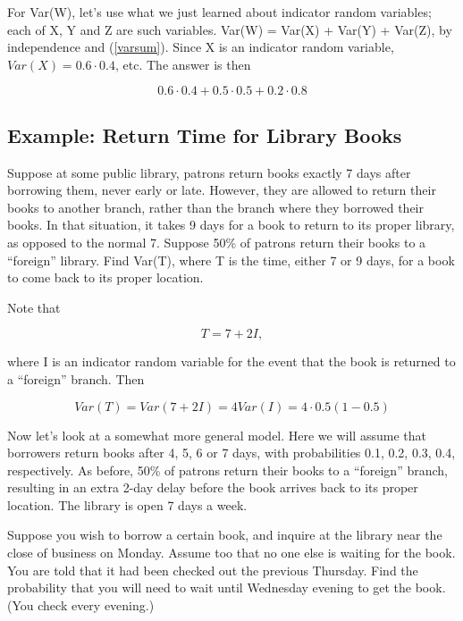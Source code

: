 For Var(W), let's use what we just learned about indicator random
variables; each of X, Y and Z are such variables.  Var(W) = Var(X) +
Var(Y) + Var(Z), by independence and (\ref{varsum}).  Since X is an
indicator random variable, $Var(X) = 0.6 \cdot 0.4$, etc.  The answer is
then

\begin{equation}
0.6 \cdot 0.4 +
0.5 \cdot 0.5 +
0.2 \cdot 0.8
\end{equation}

\subsection{Example:  Return Time for Library Books}

Suppose at some public library, patrons return books
exactly 7 days after borrowing them, never early or late.  However, they
are allowed to return their books to another branch, rather than the
branch where they borrowed their books.  In that situation, it takes 9
days for a book to return to its proper library, as opposed to the
normal 7.  Suppose 50\% of patrons return their books to a ``foreign''
library.  Find Var(T), where T is the time, either 7 or 9 days, for a
book to come back to its proper location.

Note that

\begin{equation}
T = 7 + 2 I, 
\end{equation}

where I is an indicator random variable for the event that the book is
returned to a ``foreign'' branch.  Then

\begin{equation}
Var(T) = Var(7 + 2I) =  4 Var(I) = 4 \cdot 0.5 (1 - 0.5)
\end{equation}

Now let's look at a somewhat more general model.  Here we will assume
that borrowers return books after 4, 5, 6 or 7 days, with probabilities
0.1, 0.2, 0.3, 0.4, respectively. As before, 50\% of patrons return
their books to a ``foreign'' branch, resulting in an extra 2-day delay
before the book arrives back to its proper location.  The library is
open 7 days a week.

Suppose you wish to borrow a certain book, and inquire at the library
near the close of business on Monday. Assume too that no one else is
waiting for the book.  You are told that it had been checked out the
previous Thursday. Find the probability that you will need to wait until
Wednesday evening to get the book. (You check every evening.)

